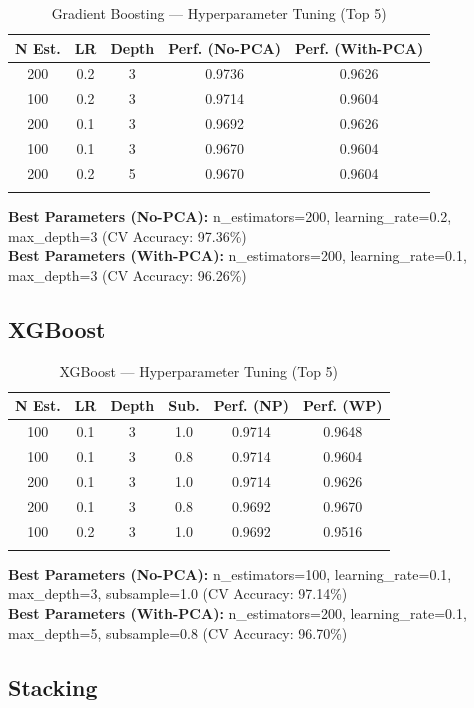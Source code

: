 \documentclass[12pt,a4paper]{article}
\begin{document}
\begin{longtable}{|c|c|c|c|c|}
\hline
\textbf{N Est.} & \textbf{LR} & \textbf{Depth} & \textbf{Perf. (No-PCA)} & \textbf{Perf. (With-PCA)} \\ \hline
\endhead
200 & 0.2 & 3 & 0.9736 & 0.9626 \\ \hline
100 & 0.2 & 3 & 0.9714 & 0.9604 \\ \hline
200 & 0.1 & 3 & 0.9692 & 0.9626 \\ \hline
100 & 0.1 & 3 & 0.9670 & 0.9604 \\ \hline
200 & 0.2 & 5 & 0.9670 & 0.9604 \\ \hline
\caption{Gradient Boosting — Hyperparameter Tuning (Top 5)}
\label{tab:gb_tuning}
\end{longtable}

\textbf{Best Parameters (No-PCA):} n\_estimators=200, learning\_rate=0.2, max\_depth=3 (CV Accuracy: 97.36\%)\\
\textbf{Best Parameters (With-PCA):} n\_estimators=200, learning\_rate=0.1, max\_depth=3 (CV Accuracy: 96.26\%)

\subsection{XGBoost}

\begin{longtable}{|c|c|c|c|c|c|}
\hline
\textbf{N Est.} & \textbf{LR} & \textbf{Depth} & \textbf{Sub.} & \textbf{Perf. (NP)} & \textbf{Perf. (WP)} \\ \hline
\endhead
100 & 0.1 & 3 & 1.0 & 0.9714 & 0.9648 \\ \hline
100 & 0.1 & 3 & 0.8 & 0.9714 & 0.9604 \\ \hline
200 & 0.1 & 3 & 1.0 & 0.9714 & 0.9626 \\ \hline
200 & 0.1 & 3 & 0.8 & 0.9692 & 0.9670 \\ \hline
100 & 0.2 & 3 & 1.0 & 0.9692 & 0.9516 \\ \hline
\caption{XGBoost — Hyperparameter Tuning (Top 5)}
\label{tab:xgb_tuning}
\end{longtable}

\textbf{Best Parameters (No-PCA):} n\_estimators=100, learning\_rate=0.1, max\_depth=3, subsample=1.0 (CV Accuracy: 97.14\%)\\
\textbf{Best Parameters (With-PCA):} n\_estimators=200, learning\_rate=0.1, max\_depth=5, subsample=0.8 (CV Accuracy: 96.70\%)

\subsection{Stacking}
\end{document}

